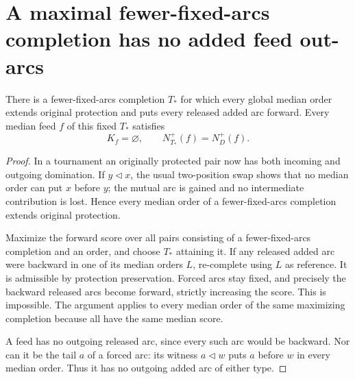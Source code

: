 \section{A maximal fewer-fixed-arcs completion has no added feed out-arcs}
\label{sec:protection-forced-maximal-feed}

\begin{theorem}
\label{thm:protection-forced-maximal-rigidity}
There is a fewer-fixed-arcs completion $T_*$ for which every global
median order extends original protection and puts every released
added arc forward. Every median feed $f$ of this fixed $T_*$ satisfies
\[
 K_f=\varnothing,\qquad N_{T_*}^+(f)=N_D^+(f).
\]
\end{theorem}
\begin{proof}
In a tournament an originally protected pair now has both incoming
and outgoing domination. If $y\triangleleft x$, the usual two-position
swap shows that no median order can put $x$ before $y$;
the mutual arc is gained and no intermediate contribution is lost.
Hence every median order of a fewer-fixed-arcs completion extends original
protection.

Maximize the forward score over all pairs consisting of a fewer-fixed-arcs
completion and an order, and choose $T_*$ attaining it. If any released
added arc were backward in one of its median orders $L$, re-complete
using $L$ as reference. It is admissible by protection preservation.
Forced arcs stay fixed, and precisely the backward released arcs
become forward, strictly increasing the score. This is impossible.
The argument applies to every median order of the same maximizing
completion because all have the same median score.

A feed has no outgoing released arc, since every such arc would be
backward. Nor can it be the tail $a$ of a forced arc: its witness
$a\triangleleft w$ puts $a$ before $w$ in every median order.
Thus it has no outgoing added arc of either type.
\end{proof}

